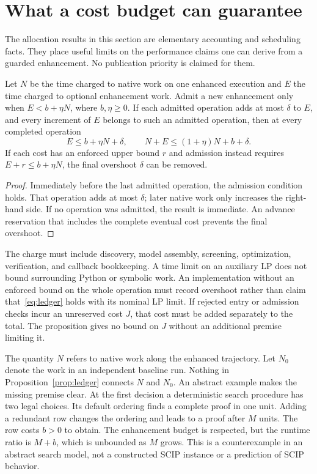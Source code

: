 \section{What a cost budget can guarantee}\label{sec:allocation}

The allocation results in this section are elementary accounting and
scheduling facts. They place useful limits on the performance claims one
can derive from a guarded enhancement. No publication priority is claimed
for them.

\begin{proposition}\label{prop:ledger}
Let $N$ be the time charged to native work on one enhanced execution and
$E$ the time charged to optional enhancement work. Admit a new enhancement
only when $E<b+\eta N$, where $b,\eta\ge0$. If each admitted operation
adds at most $\delta$ to $E$, and every increment of $E$ belongs to such
an admitted operation, then at every completed operation
\begin{equation}\label{eq:ledger}
 E\le b+\eta N+\delta,\qquad
 N+E\le(1+\eta)N+b+\delta.
\end{equation}
If each cost has an enforced upper bound $r$ and admission instead
requires $E+r\le b+\eta N$, the final overshoot $\delta$ can be removed.
\end{proposition}
\begin{proof}
Immediately before the last admitted operation, the admission condition
holds. That operation adds at most $\delta$; later native work only
increases the right-hand side. If no operation was admitted, the result
is immediate. An advance reservation that includes the complete eventual
cost prevents the final overshoot.
\end{proof}

The charge must include discovery, model assembly, screening, optimization,
verification, and callback bookkeeping. A time limit on an auxiliary LP
does not bound surrounding Python or symbolic work. An implementation
without an enforced bound on the whole operation must record overshoot
rather than claim that~\eqref{eq:ledger} holds with its nominal LP limit.
If rejected entry or admission checks incur an unreserved cost $J$, that
cost must be added separately to the total. The proposition gives no
bound on $J$ without an additional premise limiting it.

The quantity $N$ refers to native work along the enhanced trajectory.
Let $N_0$ denote the work in an independent baseline run. Nothing in
Proposition~\ref{prop:ledger} connects $N$ and $N_0$. An abstract example
makes the missing premise clear. At the first decision a deterministic
search procedure has two legal choices. Its default ordering finds a
complete proof in one unit. Adding a redundant row changes the ordering
and leads to a proof after $M$ units. The row costs $b>0$ to obtain.
The enhancement budget is respected, but the runtime ratio is $M+b$,
which is unbounded as $M$ grows. This is a counterexample in an abstract
search model, not a constructed SCIP instance or a prediction of SCIP
behavior.

